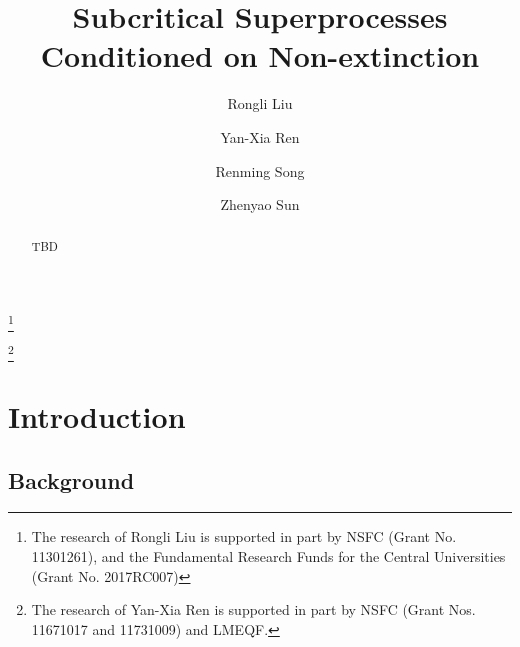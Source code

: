 \documentclass[12pt,a4paper]{amsart}
\numberwithin{equation}{section}
\theoremstyle{plain}
\theoremstyle{definition}
\theoremstyle{remark}
\begin{document}
\title {Subcritical Superprocesses Conditioned on Non-extinction}
\author[R. Liu]{Rongli Liu}
\address{Rongli Liu\\ Mathematics and Applied Mathematics\\ Beijing jiaotong University\\ Beijing 100044\\ P. R. China}
\thanks{The research of Rongli Liu is supported in part by NSFC (Grant No. 11301261), and the Fundamental Research Funds for the Central Universities (Grant No.  2017RC007)}
\author[Y.-X. Ren]{Yan-Xia Ren}
\address{Yan-Xia Ren\\ LMAM School of Mathematical Sciences \& Center for
Statistical Science\\ Peking University\\ Beijing 100871\\ P. R. China}
\thanks{The research of Yan-Xia Ren is supported in part by NSFC (Grant Nos. 11671017 and 11731009)  and LMEQF.}
\author[R. Song]{Renming Song}
\address{Renming Song\\ Department of Mathematics\\ University of Illinois at Urbana-Champaign \\ Urbana \\ IL 61801\\ USA}
\author[Z. Sun]{Zhenyao Sun}
\address{Zhenyao Sun\\ Faculty of Industrial Engineering and Management \\ Technion, Isreal Institute of Technology \\ Haifa 3200003\\ Isreal}
\begin{abstract}
    TBD
\end{abstract}
\maketitle
\section{Introduction}
\subsection{Background}
\end{document}
